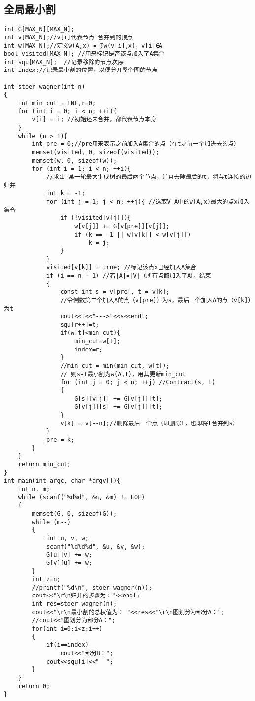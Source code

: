 \documentclass[12pt, a4paper, oneside]{ctexart}
\begin{document}
\subsection{全局最小割} 
\begin{lstlisting}
int G[MAX_N][MAX_N];
int v[MAX_N];//v[i]代表节点i合并到的顶点
int w[MAX_N];//定义w(A,x) = ∑w(v[i],x)，v[i]∈A
bool visited[MAX_N]; //用来标记是否该点加入了A集合
int squ[MAX_N];  //记录移除的节点次序
int index;//记录最小割的位置，以便分开整个图的节点
  
int stoer_wagner(int n)
{
    int min_cut = INF,r=0;
    for (int i = 0; i < n; ++i){
        v[i] = i; //初始还未合并，都代表节点本身
    }
    while (n > 1){
        int pre = 0;//pre用来表示之前加入A集合的点（在t之前一个加进去的点）
        memset(visited, 0, sizeof(visited));
        memset(w, 0, sizeof(w));
        for (int i = 1; i < n; ++i){
            //求出 某一轮最大生成树的最后两个节点，并且去除最后的t，将与t连接的边归并
            int k = -1;
            for (int j = 1; j < n; ++j){ //选取V-A中的w(A,x)最大的点x加入集合
                if (!visited[v[j]]){
                    w[v[j]] += G[v[pre]][v[j]];
                    if (k == -1 || w[v[k]] < w[v[j]])
                        k = j;
                }
            }
            visited[v[k]] = true; //标记该点x已经加入A集合
            if (i == n - 1) //若|A|=|V|（所有点都加入了A），结束
            {
                const int s = v[pre], t = v[k];
                //令倒数第二个加入A的点（v[pre]）为s，最后一个加入A的点（v[k]）为t
                cout<<t<<"--->"<<s<<endl;
                squ[r++]=t;
                if(w[t]<min_cut){
                    min_cut=w[t];
                    index=r;
                }
                //min_cut = min(min_cut, w[t]);        
                // 则s-t最小割为w(A,t)，用其更新min_cut
                for (int j = 0; j < n; ++j) //Contract(s, t)
                {
                    G[s][v[j]] += G[v[j]][t];
                    G[v[j]][s] += G[v[j]][t];
                }
                v[k] = v[--n];//删除最后一个点（即删除t，也即将t合并到s）
            }
            pre = k;
        }
    }
    return min_cut;
}
int main(int argc, char *argv[]){
    int n, m;
    while (scanf("%d%d", &n, &m) != EOF)
    {
        memset(G, 0, sizeof(G));
        while (m--)
        {
            int u, v, w;
            scanf("%d%d%d", &u, &v, &w);
            G[u][v] += w;
            G[v][u] += w;
        }
        int z=n;
        //printf("%d\n", stoer_wagner(n));
        cout<<"\r\n归并的步骤为："<<endl;
        int res=stoer_wagner(n);
        cout<<"\r\n最小割的总权值为： "<<res<<"\r\n图划分为部分A：";
        //cout<<"图划分为部分A：";
        for(int i=0;i<z;i++)
        {
            if(i==index)
                cout<<"部分B：";
            cout<<squ[i]<<"  ";
        }
    }
    return 0;
}
\end{lstlisting}
\end{document}
